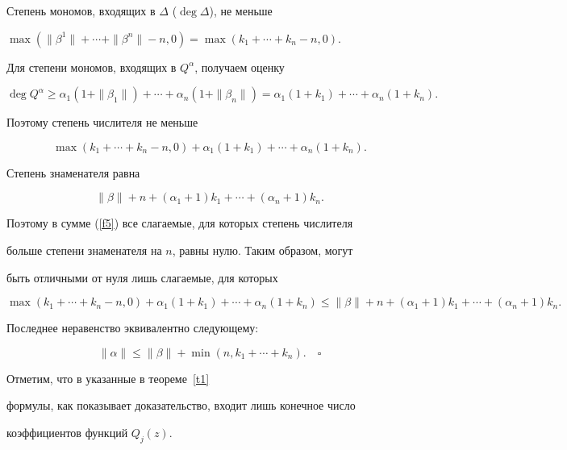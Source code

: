 Степень мономов, входящих в $\Delta$ ($\deg\Delta$), не меньше


$\max(\|\beta^1\|+\dotsb+\|\beta^n\|-n,0)=\max(k_1+\dotsb+ k_n-n,0)$.


Для степени мономов, входящих в $Q^\alpha$, получаем оценку


$$


\deg Q^\alpha\geqslant \alpha_1(1+\|\beta_1\|)+\dotsb+


\alpha_n(1+\|\beta_n\|)=


\alpha_1(1+k_1)+\dotsb+\alpha_n(1+k_n).


$$


Поэтому степень числителя не меньше


$$


\max(k_1+\dotsb+ k_n-n,0)+\alpha_1(1+k_1)+\dotsb+\alpha_n(1+k_n).


$$


Степень знаменателя равна


$$


\|\beta\|+n+(\alpha_1+1)k_1+\dotsb+(\alpha_n+1)k_n.


$$


Поэтому в сумме (\ref{f5}) все слагаемые, для которых степень числителя 


больше степени знаменателя на $n$, равны нулю. Таким образом, могут 


быть отличными от нуля лишь слагаемые, для которых


$$


\max(k_1+\dotsb+ k_n-n,0)+\alpha_1(1+k_1)+\dotsb+\alpha_n(1+k_n)\leqslant


\|\beta\|+n+(\alpha_1+1)k_1+\dotsb+(\alpha_n+1)k_n.


$$


Последнее неравенство эквивалентно следующему:


$$


\|\alpha\|\leqslant \|\beta\|+\min(n,k_1+\dotsb+ k_n).\quad \square


$$





Отметим, что  в указанные в теореме~\ref{t1}


формулы, как показывает доказательство, входит лишь конечное число 


коэффициентов функций $Q_j(z)$.








